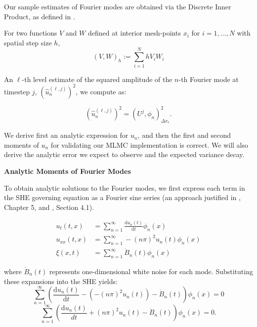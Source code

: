Our sample estimates of Fourier modes are obtained via the Discrete Inner Product,
as defined in \cite{suli2025nspdes}.

\begin{definition}
    \label{def:discrete_inner_product}
    For two functions $V$ and $W$ defined at interior mesh-points 
    $x_i$ for $i = 1, \dots, N$ with spatial step size $h$,
    \begin{equation*}
        (V,W)_h := \sum_{i = 1}^{N} h V_i W_i
    \end{equation*}
\end{definition}

An $\ell$-th level estimate of the squared amplitude of the $n$-th Fourier mode
at timestep $j$, $(\hat{u}_n^{(\ell,j)})^2$, we compute as:

\begin{equation*}
    (\hat{u}_n^{(\ell, j)})^2 = \left(U^j, \phi_n\right)_{\Delta x_\ell}^2.
\end{equation*}

We derive first an analytic expression for $u_n$, 
and then the first and second moments of $u_n$ for validating our 
MLMC implementation is correct. We will also derive the 
analytic error we expect to observe and 
the expected variance decay. 
\newline

\newpage 
\textbf{Analytic Moments of Fourier Modes}

To obtain analytic solutions to the Fourier modes, we first express each term 
in the SHE governing equation as a Fourier sine series (an approach justified 
in \cite{strauss2007partial}, Chapter 5, and \cite{da2014stochastic}, Section 4.1).

$$
\begin{aligned} 
    u_t(t,x) &= \sum_{n=1}^\infty \frac{\mathrm{d}u_n(t)}{\mathrm{d}t}\phi_n(x) \\ 
    u_{xx}(t,x) &= \sum_{n=1}^\infty -(n\pi)^2 u_n(t)\phi_n(x) \\ 
    \xi(x,t) &= \sum_{n=1}^\infty \dot{B}_n(t) \phi_n(x) 
\end{aligned}
$$

where $\dot{B}_n(t)$ represents one-dimensional white noise for each mode.
Substituting these expansions into the SHE yields:
$$\sum_{n=1}^\infty \left( \frac{\mathrm{d}u_n(t)}{\mathrm{d}t} - (-(n\pi)^2 u_n(t)) 
- \dot{B}_n(t) \right) \phi_n(x) = 0$$ $$\sum_{n=1}^\infty \left( \frac{\mathrm{d}u_n(t)}{dt}
 + (n\pi)^2 u_n(t) - \dot{B}_n(t) \right) \phi_n(x) = 0.
 $$

